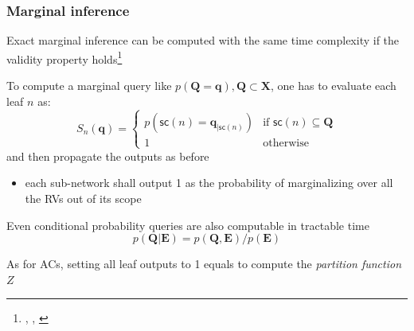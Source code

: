 \documentclass[10pt, t, xcolor={usenames,dvipsnames,svgnames}, compress]{beamer}
\newcommand{\customcite}[1]{\footnote{\scriptsize \citeauthor{#1}, \citetitle{#1}, \citeyear{#1}}}
\begin{document}
\begin{frame}
  \frametitle{Marginal inference}

Exact marginal inference can be computed with the same time complexity if the
validity property holds\customcite{Poon2011}

To compute a marginal query like $p(\mathbf{Q=q}),
\mathbf{Q}\subset\mathbf{X}$, one has to evaluate each leaf $n$ as:
\begin{equation}
  \label{eq:marg}
  S_{n}(\mathbf{q}) = \begin{cases}
    p(\mathsf{sc}(n) =\mathbf{q}_{|\mathsf{sc}(n)}) & \text{if $\mathsf{sc}(n)\subseteq\mathbf{Q}$} \\
    1 & \text{otherwise}
  \end{cases}
\end{equation}
and then propagate the outputs as before

\begin{itemize}
\item each sub-network shall output 1 as the probability of marginalizing
over all the RVs out of its scope
\end{itemize}

Even conditional probability queries are also computable
in tractable time
$$p(\mathbf{Q}|\mathbf{E}) = p(\mathbf{Q}, \mathbf{E})/p(\mathbf{E})$$

As for ACs, setting all leaf outputs to 1 equals to compute the \emph{partition function}
$Z$ 
\end{frame}
\end{document}

